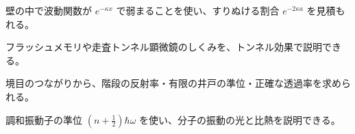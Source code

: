 \begin{furikaeri}
\begin{checklist}
\item 壁の中で波動関数が $e^{-\kappa x}$ で弱まることを使い、すりぬける割合 $e^{-2\kappa a}$ を見積もれる。
\item フラッシュメモリや走査トンネル顕微鏡のしくみを、トンネル効果で説明できる。
\item 境目のつながりから、階段の反射率・有限の井戸の準位・正確な透過率を求められる。
\item 調和振動子の準位 $(n+\tfrac12)\hbar\omega$ を使い、分子の振動の光と比熱を説明できる。
\end{checklist}
\end{furikaeri}
